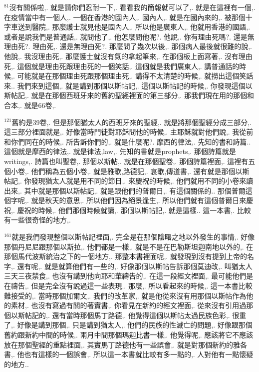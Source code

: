 \documentclass{book}
\begin{document}
$^{81}$沒有關係啦,.
就是請你們忍耐一下,.
看看我的簡報就可以了,.
就是在這裡有一個,.
在疫情當中有一個人,.
一個在香港的國內人,.
國內人,.
就是在國內來的,.
被那個十字車送到醫院,.
那麼護士就見他是國內人,.
所以他是廣東人,.
他就用香港的國語,.
或者是說我們是普通話,.
就問他了,.
他怎麼問他呢?.
他說,.
你有理由死嗎?.
還是無理由死?.
理由死,.
還是無理由死?.
那麼問了幾次以後,.
那個病人最後就很難的說,.
他說,.
我沒理由死,.
那麼護士就沒有氣的拿起筆來,.
在那個板上面寫著,.
沒有理由死,.
這個就是理由死跟理由死的一個笑話,.
這個就是我們廣東人,.
講普通話的時候,.
可能就是在那個理由死跟那個理由死,.
講得不太清楚的時候,.
就撈出這個笑話來..
我們來到這個,.
就是講到那個以斯帖記,.
這個以斯帖記的時候,.
你發現這個以斯帖記,.
就是在那個西班牙來的舊約聖經裡面的第三部分,.
那我們現在用的那個和合本,.
就是66卷,.

$^{121}$舊約是39卷,.
但是那個猶太人的西班牙來的聖經,.
就是將那個聖經分成三部分,.
這三部分裡面就是,.
好像當時門徒對耶穌問他的時候,.
主耶穌就對他們說,.
我從前和你們同在的時候,.
所告訴你們的,.
就是什麼呢?.
摩西的律法,.
先知的書和詩篇..
這個就是摩西的律法,.
就是律法,law,.
先知的書就是prophets,.
那個詩篇就是writings,.
詩篇也叫聖卷,.
那個以斯帖,.
就是在那個聖卷,.
那個詩篇裡面,.
這裡有五個小卷,.
他們稱為五個小卷,.
就是雅歌,路德記,.
哀歌,傳道書,.
還有就是那個以斯帖記,.
你發現猶太人就是用不同的節日,.
來慶祝的時候,.
他們就用不同的小卷來讀出來,.
其中就是那個以斯帖記,.
就是跟他們的普爾日,.
有這個關係的..
那個普爾這個字呢,.
就是秋天的意思,.
所以他們因為絕景逢生,.
所以他們就有這個普爾日來慶祝,.
慶祝的時候,.
他們那個時候就讀,.
那個以斯帖記,.
就是這樣..
這一本書,.
比較有一些很奇怪的地方,.

$^{161}$就是我們發現整個以斯帖記裡面,.
完全是在那個陰曙之地以外發生的事情,.
好像那個丹尼尼跟那個以斯拉,.
他們都是一樣,.
就是不是在巴勒斯坦迦南地以外的,.
在那個馬代波斯統治之下的一個地方,.
那整本書裡面呢,.
就發現到沒有提到上帝的名字,.
還有呢,.
就是就算他們有一些的,.
好像那個以斯帖告訴那個莫迪改,.
叫猶太人三天三夜禁食,.
也沒有講到他向耶和華禱告的,.
在這一段經文裡面,.
最可能他們是在禱告,.
但是完全沒有說過這一些表現..
那麼,.
所以看起來的時候,.
這一本書比較難接受的,.
當時那個加爾文,.
我們的改革家,.
就是他從來沒有用那個以斯帖作為他的素材,.
也沒有寫過有關的著實書,.
你看見在新約的經文裡面,.
從來沒有引用過那個以斯帖記的,.
還有當時那個馬丁路德,.
他覺得這個以斯帖太過民族色彩,.
很重了,.
好像是講到那個,.
只是講到猶太人,.
他們的民族的性滅亡的問題,.
好像跟那個舊約跟新約中間的時候,.
兩月中間那個瑪迦比書一樣,.
他覺得呢,.
應該將它不應該放在那個聖經的重點裡面,.
其實馬丁路德他有一些誤會,.
就是對那個新約的雅各書,.
他也有這樣的一個誤會,.
所以這一本書就比較有多一點的,.
人對他有一點懷疑的地方..
\end{document}
